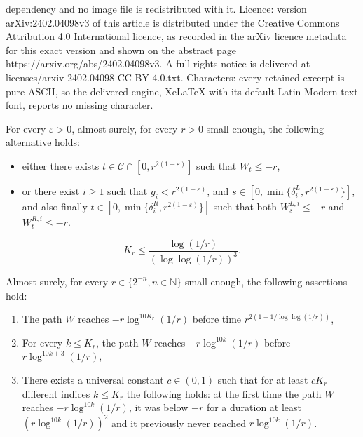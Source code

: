 \documentclass[10pt,a4paper]{amsart}
\newcommand{\N}{\mathbb{N}}
\begin{document}
dependency and no image file is redistributed with it. Licence: version arXiv:2402.04098v3 of this article is distributed under the Creative Commons Attribution 4.0 International licence, as recorded in the arXiv licence metadata for this exact version and shown on the abstract page https://arxiv.org/abs/2402.04098v3. A full rights notice is delivered at licenses/arxiv-2402.04098-CC-BY-4.0.txt. Characters: every retained excerpt is pure ASCII, so the delivered engine, XeLaTeX with its default Latin Modern text font, reports no missing character.
\begin{lem}\label{lem:technique}
For every $\varepsilon > 0$, almost surely, for every $r>0$ small enough, the following alternative holds: 
\begin{itemize}
\item either there exists $t \in \mathcal{C} \cap [0, r^{2(1-\varepsilon)}]$ such that $W_t \leq -r$,
\item or there exist $i \geq 1$ such that $g_i < r^{2(1-\varepsilon)}$, and $s \in [0, \min\{\delta^L_i, r^{2(1-\varepsilon)}\}]$, and also finally $t \in [0, \min\{\delta^R_i, r^{2(1-\varepsilon)}\}]$ such that both $W^{L,i}_s \leq -r$ and $W^{R,i}_t \leq -r$.
\end{itemize}
\end{lem}

\begin{equation}\label{eq:K_r_lemme_technique}
K_r \leq \frac{\log(1/r)}{(\log\log(1/r))^3}
.\end{equation}

\begin{lem}\label{lem:ruine}
Almost surely, for every $r \in \{2^{-n}, n \in \N\}$ small enough, the following assertions hold:
\begin{enumerate}
\item The path $W$ reaches $-r \log^{10 K_{r}}(1/r)$ before time $r^{2(1-1/\log\log(1/r))}$, 
\item For every $k \leq K_r$, the path $W$ reaches $-r \log^{10 k}(1/r)$ before $r \log^{10 k + 3}(1/r)$,
\item 
There exists a universal constant $c \in (0,1)$ such that for at least $c K_r$ different indices $k \leq K_r$ the following holds: 
at the first time the path $W$ reaches $-r \log^{10 k}(1/r)$, it was below $-r$ for a duration at least $(r \log^{10 k}(1/r))^2$ and it previously never reached $r \log^{10 k}(1/r)$.
\end{enumerate}
\end{lem}
\end{document}
